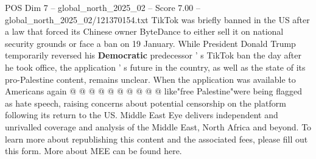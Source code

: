 \begin{textsample}{POS Dim 7 – global\_north\_2025\_02 – Score 7.00 – global\_north\_2025\_02/121370154.txt}
TikTok was briefly banned in the US after a law that forced its Chinese owner ByteDance to either sell it on national security grounds or face a ban on 19 January.
While President Donald Trump temporarily reversed his \textbf{Democratic} predecessor ' s TikTok ban the day after he took office, the application ' s future in the country, as well as the state of its pro-Palestine content, remains unclear.
When the application was available to Americans again @ @ @ @ @ @ @ @ @ @ like"free Palestine"were being flagged as hate speech, raising concerns about potential censorship on the platform following its return to the US.
Middle East Eye delivers independent and unrivalled coverage and analysis of the Middle East, North Africa and beyond.
To learn more about republishing this content and the associated fees, please fill out this form.
More about MEE can be found here.

\end{textsample}
